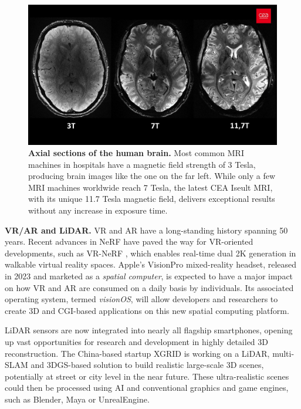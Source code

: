 \begin{figure}[htb!]
  \center
\includegraphics[width=\linewidth]{images/conclusion/cea-iseult.jpg}
\caption{\textbf{Axial sections of the human brain.} Most common \ac{MRI} machines in hospitals have a magnetic field strength of 3 Tesla, producing brain images like the one on the far left. While only a few \ac{MRI} machines worldwide reach 7 Tesla, the latest CEA Iseult \ac{MRI}, with its unique 11.7 Tesla magnetic field, delivers exceptional results without any increase in exposure time.}
\label{fig:conclusion-ceaiseult}
\end{figure}

\noindent \textbf{VR/AR and LiDAR.} \ac{VR} and \ac{AR} have a long-standing history spanning 50 years. Recent advances in \ac{NeRF} have paved the way for \ac{VR}-oriented developments, such as VR-NeRF \citep{xu2023vr}, which enables real-time dual 2K generation in walkable virtual reality spaces. Apple's VisionPro mixed-reality headset, released in 2023 and marketed as a \textit{spatial computer}, is expected to have a major impact on how \ac{VR} and \ac{AR} are consumed on a daily basis by individuals. Its associated operating system, termed \textit{visionOS}, will allow developers and researchers to create 3D and \ac{CGI}-based applications on this new spatial computing platform.

\ac{LiDAR} sensors are now integrated into nearly all flagship smartphones, opening up vast opportunities for research and development in highly detailed 3D reconstruction. The China-based startup XGRID is working on a \ac{LiDAR}, multi-\ac{SLAM} and 3D\ac{GS}-based solution to build realistic large-scale 3D scenes, potentially at street or city level in the near future. These ultra-realistic scenes could then be processed using \ac{AI} and conventional graphics and game engines, such as Blender, Maya or UnrealEngine. 

